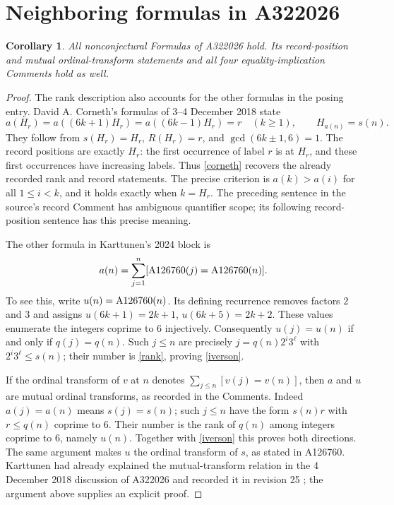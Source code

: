 \documentclass[11pt]{article}
\newtheorem{corollary}[theorem]{Corollary}
\newcommand{\A}[1]{\textnormal{A#1}}
\begin{document}
\section{Neighboring formulas in A322026}
\begin{corollary}\label{neighbors}
All nonconjectural Formulas of A322026 hold. Its record-position and
mutual ordinal-transform statements and all four equality-implication
Comments hold as well.
\end{corollary}
\begin{proof}
The rank description also accounts for the other formulas in the posing
entry. David A. Corneth's formulas of 3--4 December 2018 state
\begin{equation}\label{corneth}
 a(H_r)=a((6k+1)H_r)=a((6k-1)H_r)=r\quad(k\geq1),\qquad
 H_{a(n)}=s(n).
\end{equation}
They follow from $s(H_r)=H_r$, $R(H_r)=r$, and
$\gcd(6k\pm1,6)=1$. The record positions are exactly $H_r$:
the first occurrence of label $r$ is at $H_r$, and these first
occurrences have increasing labels. Thus \eqref{corneth} recovers
the already recorded rank and record statements. The precise criterion is
$a(k)>a(i)$ for all $1\leq i<k$, and it holds exactly when $k=H_r$.
The preceding sentence in the source's record Comment has ambiguous
quantifier scope; its following record-position sentence has this precise meaning.

The other formula in Karttunen's 2024 block is
\begin{equation}\label{iverson}
 a(n)=\sum_{j=1}^n[\A{126760}(j)=\A{126760}(n)].
\end{equation}
To see this, write $u(n)=\A{126760}(n)$. Its defining recurrence
\cite{complement} removes factors $2$ and $3$ and assigns
$u(6k+1)=2k+1$, $u(6k+5)=2k+2$. These values enumerate the
integers coprime to $6$ injectively. Consequently $u(j)=u(n)$
if and only if $q(j)=q(n)$. Such $j\leq n$ are precisely
$j=q(n)2^i3^\ell$ with $2^i3^\ell\leq s(n)$; their number is
\eqref{rank}, proving \eqref{iverson}.

If the ordinal transform of $v$ at $n$ denotes
$\sum_{j\leq n}[v(j)=v(n)]$, then $a$ and $u$ are mutual ordinal
transforms, as recorded in the Comments. Indeed $a(j)=a(n)$ means
$s(j)=s(n)$; such $j\leq n$ have the form $s(n)r$ with
$r\leq q(n)$ coprime to $6$. Their number is the rank of $q(n)$
among integers coprime to $6$, namely $u(n)$. Together with
\eqref{iverson} this proves both directions. The same argument makes
$u$ the ordinal transform of $s$, as stated in A126760.
Karttunen had already explained the mutual-transform relation in the
4 December 2018 discussion of A322026 and recorded it in revision 25
\cite{ordinalhistory}; the argument above supplies an explicit proof.


\end{proof}
\end{document}
